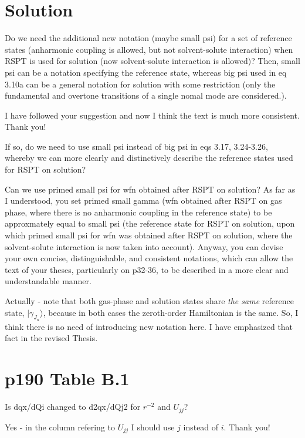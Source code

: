 \documentclass{exam}
\begin{document}
\section{Solution}
\begin{questions}

%
\question Do we need the additional new notation (maybe small psi) for a set of reference states (anharmonic coupling is allowed, but not solvent-solute interaction) when RSPT is used for solution (now solvent-solute interaction is allowed)? Then, small psi can be a notation specifying the reference state, whereas big psi used in eq 3.10a can be a general notation for solution with some restriction (only the fundamental and overtone transitions of a single nomal mode are considered.).

\begin{solution}
I have followed your suggestion and now I think the text is much more consistent. Thank you!
\end{solution}

%
\question If so, do we need to use small psi instead of big psi in eqs 3.17, 3.24-3.26, whereby we can more clearly and distinctively describe the reference states used for RSPT on solution? 

Can we use primed small psi for wfn obtained after RSPT on solution? As far as I understood, you set primed small gamma (wfn obtained after RSPT on gas phase, where there is no anharmonic coupling in the reference state) to be approxmately equal to small psi (the reference state for RSPT on solution, upon which primed small psi for wfn was obtained after RSPT on solution, where the solvent-solute interaction is now taken into account). Anyway, you can devise your own concise, distinguishable, and consistent notations, which can allow the text of your theses, particularly on p32-36, to be described in a more clear and understandable manner.

\begin{solution}
Actually - note that both gas-phase and solution states share \emph{the same} reference state, $\vert \gamma_{J_n}\rangle$,
because in both cases the zeroth-order Hamiltonian is the same. So, I think there is no need of introducing
new notation here. I have emphasized that fact in the revised Thesis.
\end{solution}
\end{questions}

\section{p190 Table B.1}
\begin{questions}

%
\question Is dqx/dQi changed to d2qx/dQj2 for $r^{-2}$ and $U_{jj}$?

\begin{solution}
Yes - in the column refering to $U_{jj}$ I should use $j$ instead of $i$. Thank you!
\end{solution}
\end{questions}
\end{document}
